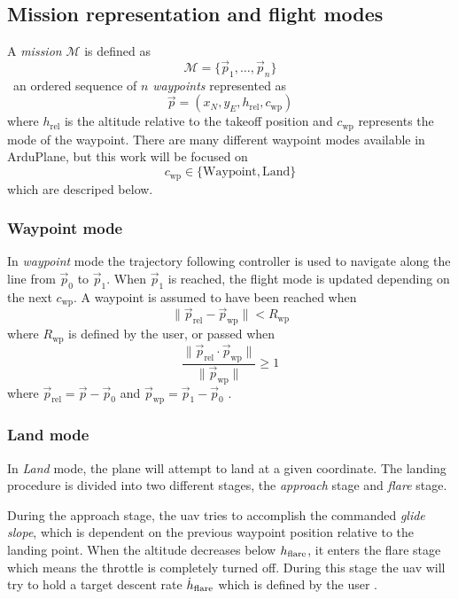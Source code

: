 \subsection{Mission representation and flight modes}\label{sec:mission}
A \textit{mission} $\mathcal{M}$ is defined as 
\begin{equation}
    \mathcal{M} = \{\vec{p}_1, \hdots, \vec{p}_n\}
\end{equation}
\ie\  an ordered sequence of $n$ \textit{waypoints} represented as 
\begin{equation}
    \vec{p}=(x_N, y_E, h_{\text{rel}}, c_{\text{wp}})
\end{equation}
where $h_{\text{rel}}$ is the altitude relative to the takeoff position and $c_{\text{wp}}$ represents the mode of the waypoint. There are many different waypoint modes available
in ArduPlane, but this work will be focused on
\begin{equation}
    c_{\text{wp}}\in \{\text{Waypoint}, \text{Land}\}
\end{equation}
which are descriped below.
\subsubsection{Waypoint mode}
In \textit{waypoint} mode the trajectory following controller is used
to navigate along the line from $\vec{p}_0$ to $\vec{p}_1$. When $\vec{p}_1$ is reached, the flight mode
is updated depending on the next $c_{\text{wp}}$. A waypoint is assumed to have been reached when
\begin{equation}
    \|\vec{p}_{\text{rel}}-\vec{p}_{\text{wp}}\| < R_{\text{wp}}
\end{equation}
where $R_{\text{wp}}$ is defined by the user, or passed when
\begin{equation}
    \frac{\|\vec{p}_{\text{rel}}\cdot \vec{p}_{\text{wp}}\|}{\|\vec{p}_{\text{wp}}\|}
     \geq 1
\end{equation}
where $\vec{p}_{\text{rel}}=\vec{p}-\vec{p}_0$ and $\vec{p}_{\text{wp}}=\vec{p}_1-\vec{p}_0$ \cite{ardupilot_auto}.
\subsubsection{Land mode}
In \textit{Land} mode, the plane will attempt to land at a given coordinate. The landing procedure 
is divided into two different stages, the \textit{approach} stage and \textit{flare} stage.

During the approach stage, the \ac{uav} tries to accomplish the commanded \textit{glide slope}, which is
dependent on the previous waypoint position relative to the landing point. When the altitude decreases
below $h_{\text{flare}}$, it enters the flare stage which means the throttle is completely turned off. 
During this stage the \ac{uav} will try to hold a target descent rate $\dot{h}_{\text{flare}}$ which is
defined by the user \cite{ardupilot_land}.